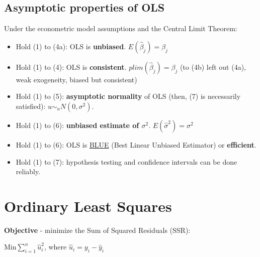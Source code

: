 \documentclass[10pt, a4paper, landscape]{extarticle}
\begin{document}
\begin{multicols}{3}
	\subsection*{Asymptotic properties of OLS}
		Under the econometric model assumptions and the Central Limit Theorem:
		\begin{itemize}[leftmargin=*]
			\item Hold (1) to (4a): OLS is \textbf{unbiased}. $E(\hat{\beta}_j) = \beta_j$
			\item Hold (1) to (4): OLS is \textbf{consistent}. $plim(\hat{\beta}_j) = \beta_j$ (to (4b) left out (4a), weak exogeneity, biased but consistent)
			\item Hold (1) to (5): \textbf{asymptotic normality} of OLS (then, (7) is necessarily satisfied): $u \sim_a N(0,\sigma^2)$.
			\item Hold (1) to (6): \textbf{unbiased estimate of $\sigma^2$}. $E(\hat{\sigma}^2) = \sigma^2$
			\item Hold (1) to (6): OLS is \textcolor{blue}{\href{https://www.youtube.com/watch?v=68ugkg9RePc}{BLUE}} (Best Linear Unbiased Estimator) or \textbf{efficient}. 
			\item Hold (1) to (7): hypothesis testing and confidence intervals can be done reliably.
		\end{itemize}

\section*{Ordinary Least Squares}
	\textbf{Objective} - minimize the Sum of Squared Residuals (SSR):
	\begin{center}
		$\text{Min} \sum_{i=1}^n \hat{u}_i^2$, where $\hat{u}_i = y_i - \hat{y}_i$
	\end{center}

\end{multicols}
\end{document}

